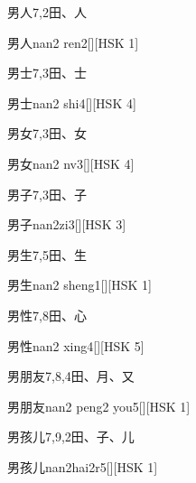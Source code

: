 \begin{entry}{男人}{7,2}{⽥、⼈}
  \begin{phonetics}{男人}{nan2 ren2}[][HSK 1]
  \end{phonetics}
\end{entry}

\begin{entry}{男士}{7,3}{⽥、⼠}
  \begin{phonetics}{男士}{nan2 shi4}[][HSK 4]
  \end{phonetics}
\end{entry}

\begin{entry}{男女}{7,3}{⽥、⼥}
  \begin{phonetics}{男女}{nan2 nv3}[][HSK 4]
  \end{phonetics}
\end{entry}

\begin{entry}{男子}{7,3}{⽥、⼦}
  \begin{phonetics}{男子}{nan2zi3}[][HSK 3]
  \end{phonetics}
\end{entry}

\begin{entry}{男生}{7,5}{⽥、⽣}
  \begin{phonetics}{男生}{nan2 sheng1}[][HSK 1]
  \end{phonetics}
\end{entry}

\begin{entry}{男性}{7,8}{⽥、⼼}
  \begin{phonetics}{男性}{nan2 xing4}[][HSK 5]
  \end{phonetics}
\end{entry}

\begin{entry}{男朋友}{7,8,4}{⽥、⽉、⼜}
  \begin{phonetics}{男朋友}{nan2 peng2 you5}[][HSK 1]
  \end{phonetics}
\end{entry}

\begin{entry}{男孩儿}{7,9,2}{⽥、⼦、⼉}
  \begin{phonetics}{男孩儿}{nan2hai2r5}[][HSK 1]
  \end{phonetics}
\end{entry}

